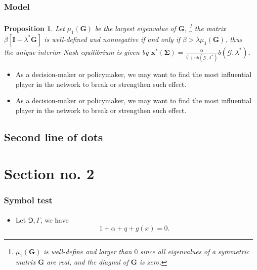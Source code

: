 \documentclass{beamer}
\newtheorem{propo}{Proposition}
\begin{document}
\begin{frame}[label=current]
    \frametitle{Model}
    \framesubtitle{}
    \begin{propo}
        Let $\mu_1(\bm{G})$ be the largest eigenvalue of $\bm{G}$,
        \footnote{$\mu_1(\bm{G})$ is well-define and larger than $0$ since all eigenvalues
        of a symmetric matrix $\bm{G}$ are real, and the diagnal of $\bm{G}$ is zero.}
        the matrix $\beta[\bm{I}-\lambda^*\bm{G}]$ is well-defined and nonnegative
        if and only if $\beta>\lambda\mu_1(\bm{G})$, thus the unique interior Nash equilibrium
        is given by $\bm{x}^*(\bm{\Sigma})=\frac{\alpha}{\beta+\gamma b(\mathscr{G},\lambda^*)}
        b(\mathscr{G},\lambda^*)$.
    \end{propo}
    \begin{itemize}
        \item As a decision-maker or policymaker, we may want to find the most
        influential player in the network to break or strengthen such effect.
        \item As a decision-maker or policymaker, we may want to find the most
           influential player in the network to break or strengthen such effect.
    \end{itemize}
\end{frame}
\subsection{Second line of dots} %

\section{Section no. 2} 

\begin{frame}[label=current]
  \frametitle{Symbol test}
  \framesubtitle{}
  \begin{itemize}
    \item Let $\Game, \varGamma$, we have 
      \[
        1 +\alpha + q + g(x) = 0.
      \]
  \end{itemize}
\end{frame}

\begin{frame}[allowframebreaks]
    
\end{frame}
\end{document}
